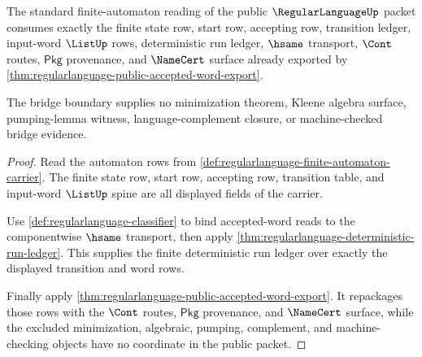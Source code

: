 \begin{theorem}
\label{thm:regularlanguage-standard-automaton-bridge-boundary}
The standard finite-automaton reading of the public $\RegularLanguageUp$ packet
consumes exactly the finite state row, start row, accepting row, transition
ledger, input-word $\ListUp$ rows, deterministic run ledger, $\hsame$ transport,
$\Cont$ routes, $\mathsf{Pkg}$ provenance, and $\NameCert$ surface already
exported by \autoref{thm:regularlanguage-public-accepted-word-export}.

The bridge boundary supplies no minimization theorem, Kleene algebra surface,
pumping-lemma witness, language-complement closure, or machine-checked bridge
evidence.
\end{theorem}
\begin{proof}
Read the automaton rows from
\autoref{def:regularlanguage-finite-automaton-carrier}. The finite state row,
start row, accepting row, transition table, and input-word $\ListUp$ spine are
all displayed fields of the carrier.

Use \autoref{def:regularlanguage-classifier} to bind accepted-word reads to the
componentwise $\hsame$ transport, then apply
\autoref{thm:regularlanguage-deterministic-run-ledger}. This supplies the
finite deterministic run ledger over exactly the displayed transition and word
rows.

Finally apply \autoref{thm:regularlanguage-public-accepted-word-export}. It
repackages those rows with the $\Cont$ routes, $\mathsf{Pkg}$ provenance, and
$\NameCert$ surface, while the excluded minimization, algebraic, pumping,
complement, and machine-checking objects have no coordinate in the public
packet.
\end{proof}

